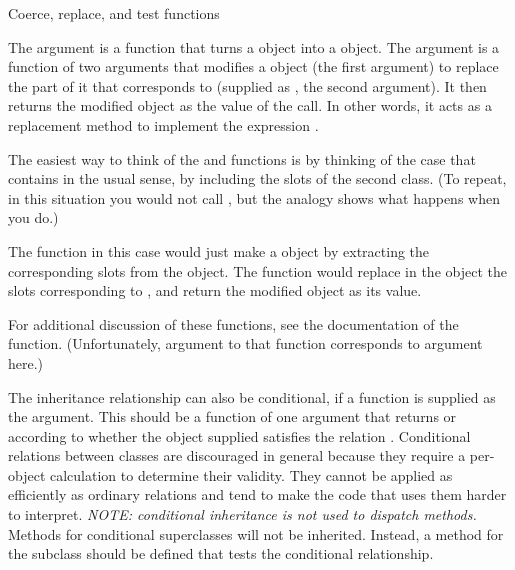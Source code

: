 \begin{Section}{Coerce, replace, and test functions}

The   argument is a function that turns a
 object into a  object.  The
 argument is a function of two arguments that modifies a 
object (the first argument) to replace the part of it that
corresponds to  (supplied as , the second
argument).  It then returns the modified object as the value of the
call.  In other words, it acts as a replacement method to
implement the expression .

The easiest way to think of the   and 
functions is by thinking of the case that  
contains  in the usual sense, by including the slots of
the second class.  (To repeat, in this situation you would not call
, but the analogy shows what happens when you do.)

The  function in this case would just make a
 object by extracting the corresponding slots from the
 object. The  function would replace in
the  object the slots corresponding to ,
and return the modified object as its value.

For additional discussion of these functions, see
the documentation of the
 function.  (Unfortunately, argument
 to that function corresponds to argument  here.)

The inheritance relationship can also be conditional, if a function is supplied as the
 argument.  This should be a function of one argument
that returns  or  according to whether the
object supplied satisfies the relation .
Conditional relations between
classes are discouraged in general because they require a per-object
calculation to determine their validity. They cannot be applied
as efficiently as ordinary relations and tend to make the code that
uses them harder to interpret.  \emph{NOTE:  conditional inheritance
is not used to dispatch methods.}  Methods for conditional
superclasses will not be inherited.  Instead, a method for the
subclass should be defined that tests the conditional relationship.
\end{Section}
%

